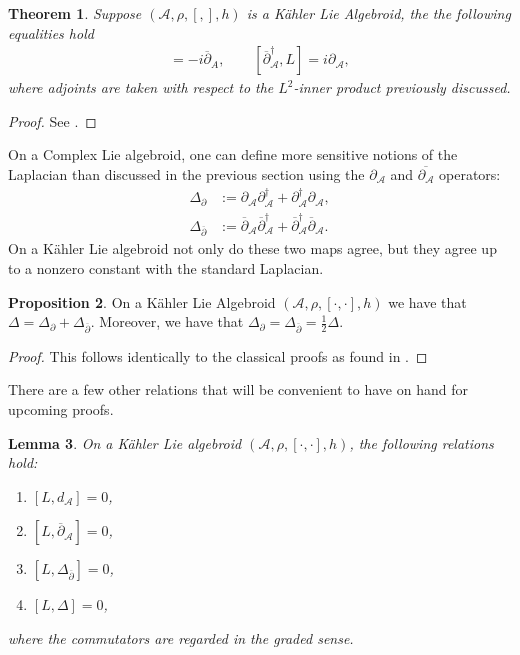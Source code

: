 \documentclass{amsart}
\newcommand{\p}{\partial}
\newtheorem{theorem}{Theorem}
\newtheorem{lemma}[theorem]{Lemma}
\theoremstyle{definition}
\newtheorem{prop}[theorem]{Proposition}
\newcommand{\A}{\mathcal{A}}
\theoremstyle{definition}
\begin{document}
\begin{theorem}\label{HuKahlerRelations}
    Suppose $(\A,\rho ,[,],h)$ is a K\"ahler Lie Algebroid, the the following equalities hold
    \begin{align*}
        [\p_\A^\dagger ,L] = -i\overline{\p}_A , \qquad
        [\overline{\p}_\A^\dagger, L] = i\p_\A,
    \end{align*}
    where adjoints are taken with respect to the $L^2$-inner product previously discussed.
\end{theorem}
\begin{proof}
    See \cite[Theorem 1]{MR4722602}.
\end{proof}
On a Complex Lie algebroid, one can define more sensitive notions of the Laplacian than discussed in the previous section using the $\p_\A$ and $\overline{\p_\A}$ operators:
\begin{align*}
    \Delta_\p &:= \p_\A \p_\A^\dagger + \p_\A^\dagger \p_\A, \\
    \Delta_{\overline{\p}} &:= \overline{\p}_\A \overline{\p}_\A^\dagger + \overline{\p}_\A^\dagger\overline{\p}_\A. 
\end{align*}
On a K\"ahler Lie algebroid not only do these two maps agree, but they agree up to a nonzero constant with the standard Laplacian. 
\begin{prop}\label{AllLaplaciansAreSame}
On a K\"ahler Lie Algebroid $(\A, \rho, [\cdot, \cdot], h)$ we have that $\Delta = \Delta_\p + \Delta_{\overline{\p}}$. Moreover, we have that $\Delta_\p = \Delta_{\overline{\p}} = \frac{1}{2}\Delta$.
\end{prop}
\begin{proof}
    This follows identically to the classical proofs as found in \cite[page 115-116]{MR507725}.
\end{proof}
There are a few other relations that will be convenient to have on hand for upcoming proofs.
\begin{lemma}
    On a Kähler Lie algebroid $(\A, \rho, [\cdot, \cdot],h)$, the following relations hold:
    \begin{enumerate}
        \item $[L,d_\A]=0$,
        \item $[L,\overline{\p}_\A]=0$,
        \item $[L,\Delta_{\overline{\p}}]=0$, 
        \item $[L,\Delta]=0$,
    \end{enumerate}
    where the commutators are regarded in the graded sense.
\end{lemma}
\end{document}
